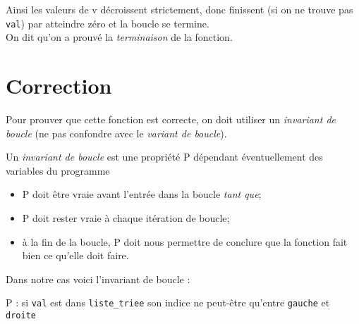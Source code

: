 Ainsi les valeurs de v décroissent strictement, donc finissent (si on ne trouve pas \texttt{val}) par atteindre zéro et la boucle se termine.\\
On dit qu'on a prouvé la \textit{terminaison} de la fonction.

\section{Correction}

Pour prouver que cette fonction est correcte, on doit utiliser un \textit{invariant de boucle} (ne pas confondre avec le \textit{variant de boucle}).

\begin{definition}[]
Un \textit{invariant de boucle} est une propriété P dépendant éventuellement des variables du programme
\begin{itemize}
    \item   P doit être vraie avant l'entrée dans la boucle \textit{tant que};
    \item   P doit rester vraie à chaque itération de boucle;
    \item   à la fin de la boucle, P doit nous permettre de conclure que la fonction \og fait bien ce qu'elle doit faire\fg{}.
\end{itemize}
\end{definition}


Dans notre cas voici l'invariant de boucle :
\begin{center}
P : \og si \texttt{val} est dans \texttt{liste_triee} son indice ne peut-être qu'entre \texttt{gauche} et \texttt{droite}\fg{}
\end{center}

